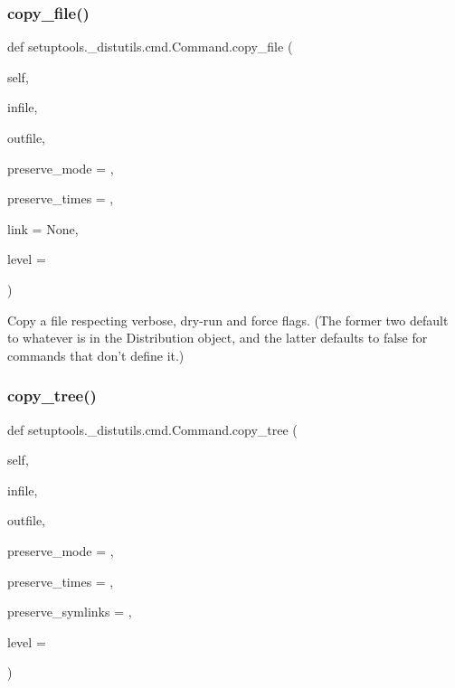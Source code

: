 \subsubsection{\texorpdfstring{copy\+\_\+file()}{copy\_file()}}
{\footnotesize\ttfamily def setuptools.\+\_\+distutils.\+cmd.\+Command.\+copy\+\_\+file (\begin{DoxyParamCaption}\item[{}]{self,  }\item[{}]{infile,  }\item[{}]{outfile,  }\item[{}]{preserve\+\_\+mode = {},  }\item[{}]{preserve\+\_\+times = {},  }\item[{}]{link = {\ttfamily None},  }\item[{}]{level = {} }\end{DoxyParamCaption})}

\begin{DoxyVerb}Copy a file respecting verbose, dry-run and force flags.  (The
former two default to whatever is in the Distribution object, and
the latter defaults to false for commands that don't define it.)\end{DoxyVerb}
 \mbox{\label{classsetuptools_1_1__distutils_1_1cmd_1_1Command_acfc87e9fa56d525198cbcea379cc48e0}} 
\subsubsection{\texorpdfstring{copy\+\_\+tree()}{copy\_tree()}}
{\footnotesize\ttfamily def setuptools.\+\_\+distutils.\+cmd.\+Command.\+copy\+\_\+tree (\begin{DoxyParamCaption}\item[{}]{self,  }\item[{}]{infile,  }\item[{}]{outfile,  }\item[{}]{preserve\+\_\+mode = {},  }\item[{}]{preserve\+\_\+times = {},  }\item[{}]{preserve\+\_\+symlinks = {},  }\item[{}]{level = {} }\end{DoxyParamCaption})}

